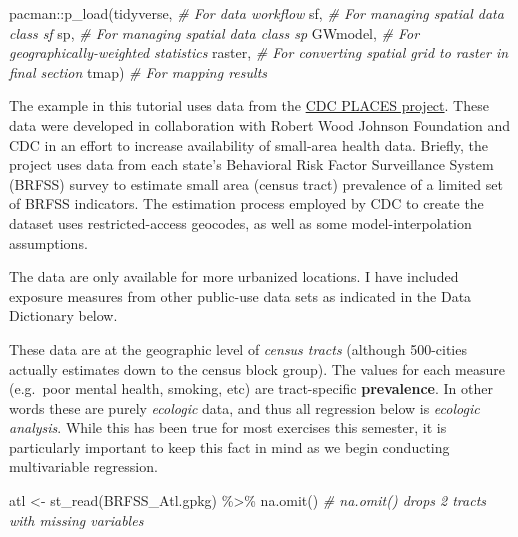 \documentclass[
]{book}
\newenvironment{Shaded}{\begin{snugshade}}{\end{snugshade}}
\newcommand{\CommentTok}[1]{\textcolor[rgb]{0.56,0.35,0.01}{\textit{#1}}}
\newcommand{\FunctionTok}[1]{\textcolor[rgb]{0.00,0.00,0.00}{#1}}
\newcommand{\NormalTok}[1]{#1}
\newcommand{\OtherTok}[1]{\textcolor[rgb]{0.56,0.35,0.01}{#1}}
\newcommand{\SpecialCharTok}[1]{\textcolor[rgb]{0.00,0.00,0.00}{#1}}
\newcommand{\StringTok}[1]{\textcolor[rgb]{0.31,0.60,0.02}{#1}}
\begin{document}
\begin{Shaded}
\begin{Highlighting}[]
\NormalTok{pacman}\SpecialCharTok{::}\FunctionTok{p\_load}\NormalTok{(tidyverse,   }\CommentTok{\# For data workflow}
\NormalTok{               sf,          }\CommentTok{\# For managing spatial data class sf}
\NormalTok{               sp,          }\CommentTok{\# For managing spatial data class sp}
\NormalTok{               GWmodel,     }\CommentTok{\# For geographically{-}weighted statistics}
\NormalTok{               raster,      }\CommentTok{\# For converting spatial grid to raster in final section}
\NormalTok{               tmap)        }\CommentTok{\# For mapping results}
\end{Highlighting}
\end{Shaded}

The example in this tutorial uses data from the \href{https://www.cdc.gov/places/index.html}{CDC PLACES project}. These data were developed in collaboration with Robert Wood Johnson Foundation and CDC in an effort to increase availability of small-area health data. Briefly, the project uses data from each state's Behavioral Risk Factor Surveillance System (BRFSS) survey to estimate small area (census tract) prevalence of a limited set of BRFSS indicators. The estimation process employed by CDC to create the dataset uses restricted-access geocodes, as well as some model-interpolation assumptions.

The data are only available for more urbanized locations. I have included exposure measures from other public-use data sets as indicated in the Data Dictionary below.

These data are at the geographic level of \emph{census tracts} (although 500-cities actually estimates down to the census block group). The values for each measure (e.g.~poor mental health, smoking, etc) are tract-specific \textbf{prevalence}. In other words these are purely \emph{ecologic} data, and thus all regression below is \emph{ecologic analysis}. While this has been true for most exercises this semester, it is particularly important to keep this fact in mind as we begin conducting multivariable regression.

\begin{Shaded}
\begin{Highlighting}[]
\NormalTok{atl }\OtherTok{\textless{}{-}} \FunctionTok{st\_read}\NormalTok{(}\StringTok{\textquotesingle{}BRFSS\_Atl.gpkg\textquotesingle{}}\NormalTok{) }\SpecialCharTok{\%\textgreater{}\%}
  \FunctionTok{na.omit}\NormalTok{() }\CommentTok{\# na.omit() drops 2 tracts with missing variables}
\end{Highlighting}
\end{Shaded}
\end{document}
